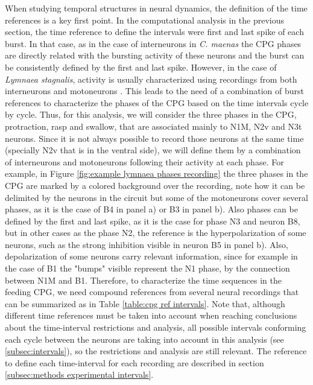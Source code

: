 When studying temporal structures in neural dynamics, the definition of the time references is a key first point. In the computational analysis in the previous section, the time reference to define the intervals were first and last spike of each burst. In that case, as in the case of interneurons in \textit{C. maenas} the CPG phases are directly related with the bursting activity of these neurons and the burst can be consistently defined by the first and last spike. However, in the case of \textit{Lymnaea stagnalis}, activity is usually characterized using recordings from both interneurons and motoneurons \parencite{elliott_interactions_1985, staras_pattern-generating_1998, benjamin_distributed_2012}. This leads to the need of a combination of burst references to characterize the phases of the CPG based on the time intervals cycle by cycle. Thus, for this analysis, we will consider the three phases in the CPG, protraction, rasp and swallow, that are associated mainly to N1M, N2v and N3t neurons. Since it is not always possible to record those neurons at the same time (specially N2v that is in the ventral side), we will define them by a combination of interneurons and motoneurons following their activity at each phase. For example, in Figure \ref{fig:example lymnaea phases recording} the three phases in the  CPG are marked by a colored background over the recording, note how it can be delimited by the neurons in the circuit but some of the motoneurons cover several phases, as it is the case of B4 in panel a) or B3 in panel b). Also phases can be defined by the first and last spike, as it is the case for phase N3 and neuron B8, but in other cases as the phase N2, the reference is the hyperpolarization of some neurons, such as the strong inhibition visible in neuron B5 in panel b). Also, depolarization of some neurons carry relevant information, since for example in the case of B1 the "bumps" visible represent the N1 phase, by the connection between N1M and B1. Therefore, to characterize the time sequences in the feeding CPG, we need compound references from several neural recordings that can be summarized as in Table \ref{table:cpg ref intervals}. Note that, although different time references must be taken into account when reaching conclusions about the time-interval restrictions and analysis, all possible intervals conforming each cycle between the neurons are taking into account in this analysis (see \ref{subsec:intervals}), so the restrictions and analysis are still relevant. The reference to define each time-interval for each recording are described in section \ref{subsec:methods experimental intervals}.


